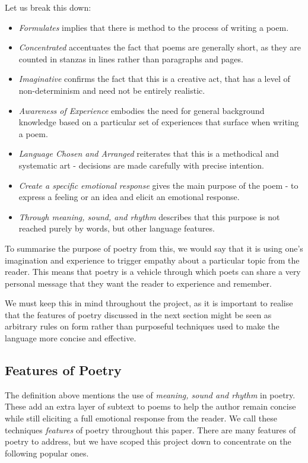 Let us break this down:
\begin{itemize}
\item{\textit{Formulates} implies that there is method to the process of writing a poem.}
\item{\textit{Concentrated} accentuates the fact that poems are generally short, as they are counted in stanzas in lines rather than paragraphs and pages.}
\item{\textit{Imaginative} confirms the fact that this is a creative act, that has a level of non-determinism and need not be entirely realistic.}
\item{\textit{Awareness of Experience} embodies the need for general background knowledge based on a particular set of experiences that surface when writing a poem.}
\item{\textit{Language Chosen and Arranged} reiterates that this is a methodical and systematic art - decisions are made carefully with precise intention.}
\item{\textit{Create a specific emotional response} gives the main purpose of the poem - to express a feeling or an idea and elicit an emotional response.}
\item{\textit{Through meaning, sound, and rhythm} describes that this purpose is not reached purely by words, but other language features.}
\end{itemize}

To summarise the purpose of poetry from this, we would say that it is using one's imagination and experience to trigger empathy about a particular topic from the reader. This means that poetry is a vehicle through which poets can share a very personal message that they want the reader to experience and remember. 

We must keep this in mind throughout the project, as it is important to realise that the features of poetry discussed in the next section might be seen as arbitrary rules on form rather than purposeful techniques used to make the language more concise and effective.

\subsection{Features of Poetry}

The definition above mentions the use of \textit{meaning, sound and rhythm} in poetry. These add an extra layer of subtext to poems to help the author remain concise while still eliciting a full emotional response from the reader. We call these techniques \textit{features} of poetry throughout this paper. There are many features of poetry to address, but we have scoped this project down to concentrate on the following popular ones.


